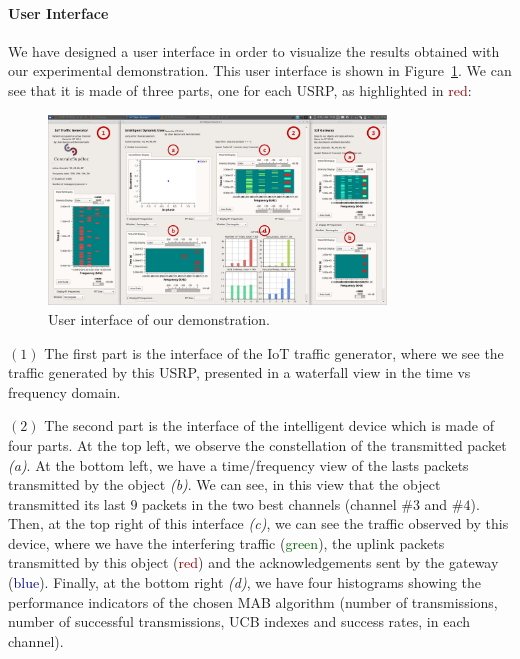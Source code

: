\paragraph{User Interface}

We have designed a user interface in order to visualize the results obtained  with our experimental demonstration. This user interface is shown in Figure~\ref{fig:42:UI}.
We can see that it is made of three parts, one for each USRP, as highlighted in \textcolor{darkred}{red}:

\begin{figure}[!t]
    \centering
    \includegraphics[width=0.80\textwidth]{UI.eps}
    \caption{User interface of our demonstration.}
    \label{fig:42:UI}
\end{figure}


$(1)$ The first part is the interface of the IoT traffic generator, where we see the traffic generated by this USRP, presented in a waterfall view in the time vs frequency domain.

$(2)$ The second part is the interface of the intelligent device which is made of four parts.
At the top left, we observe the constellation of the transmitted packet \emph{(a)}.
At the bottom left, we have a time/frequency view of the lasts packets transmitted by the object \emph{(b)}.
We can see, in this view that the object transmitted its last $9$ packets in the two best channels (channel $\#3$ and $\#4$).
Then, at the top right of this interface \emph{(c)}, we can see the traffic observed by this device, where we have the interfering traffic (\textcolor{darkgreen}{green}), the uplink packets transmitted by this object (\textcolor{darkred}{red}) and the acknowledgements sent by the gateway (\textcolor{darkblue}{blue}).
Finally, at the bottom right \emph{(d)}, we have four histograms showing the performance indicators of the chosen MAB algorithm (number of transmissions, number of successful transmissions, UCB indexes and success rates, in each channel).

